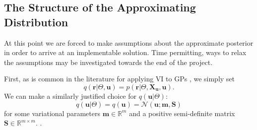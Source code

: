 \documentclass{mprop}
\theoremstyle{definition}
\begin{document}
\subsection{The Structure of the Approximating Distribution}

At this point we are forced to make assumptions about the approximate posterior
in order to arrive at an implementable solution. Time permitting, ways to relax
the assumptions may be investigated towards the end of the project.

First, as is common in the literature for applying VI to GPs
\cite{DBLP:conf/nips/ChengB17,DBLP:conf/uai/HensmanFL13,DBLP:conf/icml/HoangHL15,DBLP:journals/jmlr/Titsias09},
we simply set
\begin{equation}
  q(\mathbf{r} | \Theta, \mathbf{u}) = p(\mathbf{r} | \Theta, \mathbf{X_u},
  \mathbf{u}).
\end{equation}
We can make a similarly justified choice for $q(\mathbf{u} | \Theta)$:
\begin{equation}
  q(\mathbf{u} | \Theta) = q(\mathbf{u}) = \mathcal{N}(\mathbf{u}; \mathbf{m}, \mathbf{S})
\end{equation}
for some variational parameters $\mathbf{m} \in \mathbb{R}^{m}$ and a positive
semi-definite matrix $\mathbf{S} \in \mathbb{R}^{m \times m}$.
\cite{DBLP:conf/nips/ChengB17,DBLP:journals/jmlr/HensmanDS17,DBLP:conf/aaai/HoangHL17}.
\end{document}
